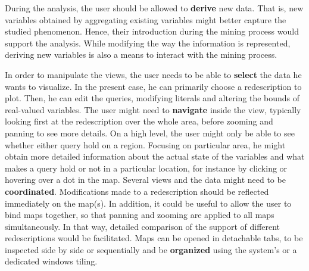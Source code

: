 During the analysis, the user should be allowed to \textbf{derive} new
data. That is, new variables obtained by aggregating existing
variables might better capture the studied phenomenon. Hence, their
introduction during the mining process would support the
analysis. While modifying the way the information is represented,
deriving new variables is also a means to interact with the mining
process.

    In order to manipulate the views, the user needs to be
able to \textbf{select} the data he wants to visualize. In the present
case, he can primarily choose a redescription to plot. Then, he can
edit the queries, modifying literals and altering the bounds of real-valued variables.  The user might need to \textbf{navigate} inside the
view, typically looking first at the redescription over the whole
area, before zooming and panning to see more details. On a high level,
the user might only be able to see whether either query hold on a
region. Focusing on particular area, he might obtain more detailed
information about the actual state of the variables and what makes a
query hold or not in a particular location, for instance by clicking
or hovering over a dot in the map. Several views and the data might
need to be \textbf{coordinated}.  Modifications made to a
redescription should be reflected immediately on the map(s). In
addition, it could be useful to allow the user to bind maps together,
so that panning and zooming are applied to all maps simultaneously. In
that way, detailed comparison of the support of different
redescriptions would be facilitated.  Maps can be opened in detachable
tabs, to be inspected side by side or sequentially and be
\textbf{organized} using the system's or a dedicated windows tiling.

